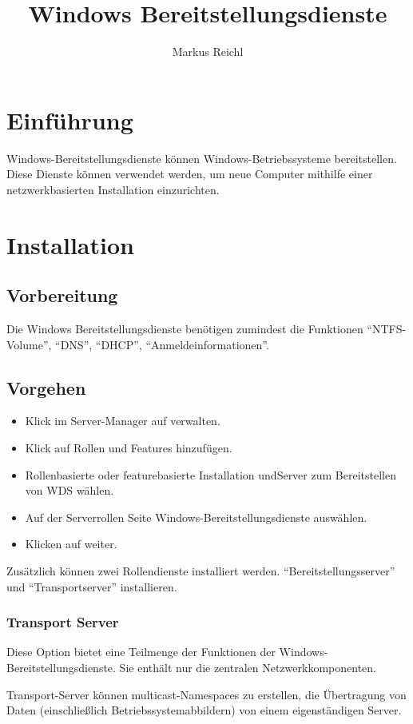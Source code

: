 \documentclass[a4paper,11pt]{article}
\title{Windows Bereitstellungsdienste}
\author{Markus Reichl}
\begin{document}
\maketitle

\section{Einf\"uhrung}
Windows-Bereitstellungsdienste können Windows-Betriebssysteme bereitstellen. 
Diese Dienste können verwendet werden, um neue Computer mithilfe einer netzwerkbasierten Installation einzurichten.

\section{Installation}
\subsection{Vorbereitung}
Die Windows Bereitstellungsdienste ben\"otigen zumindest die Funktionen ``NTFS-Volume'', ``DNS'', ``DHCP'', ``Anmeldeinformationen''.

\subsection{Vorgehen}
\begin{itemize}
 \item Klick im Server-Manager auf verwalten.
 \item Klick auf Rollen und Features hinzufügen.
 \item Rollenbasierte oder featurebasierte Installation undServer zum Bereitstellen von WDS w\"ahlen.
 \item Auf der Serverrollen Seite Windows-Bereitstellungsdienste ausw\"ahlen.
 \item Klicken auf weiter.
\end{itemize}

Zus\"atzlich k\"onnen zwei Rollendienste installiert werden. ``Bereitstellungsserver'' und ``Transportserver'' installieren.

\subsubsection{Transport Server}
Diese Option bietet eine Teilmenge der Funktionen der Windows-Bereitstellungsdienste. Sie enthält nur die zentralen Netzwerkkomponenten.

Transport-Server können multicast-Namespaces zu erstellen, die Übertragung von Daten (einschließlich Betriebssystemabbildern) von einem eigenständigen Server.
\end{document}
